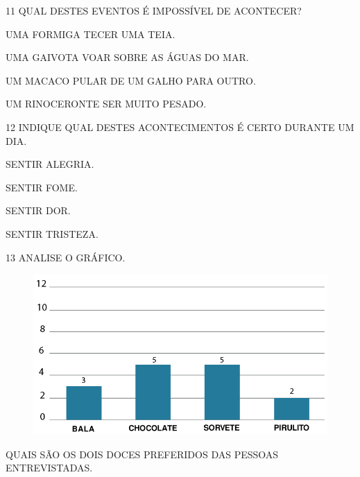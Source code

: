 \vspace{1cm}

\num{11} QUAL DESTES EVENTOS É IMPOSSÍVEL DE ACONTECER?

\begin{escolha}
\item UMA FORMIGA TECER UMA TEIA.

\item UMA GAIVOTA VOAR SOBRE AS ÁGUAS DO MAR.

\item UM MACACO PULAR DE UM GALHO PARA OUTRO.

\item UM RINOCERONTE SER MUITO PESADO.
\end{escolha}

\vspace{1cm}

\num{12} INDIQUE QUAL DESTES ACONTECIMENTOS É CERTO DURANTE UM DIA.

\begin{escolha}
\item SENTIR ALEGRIA.

\item SENTIR FOME.

\item SENTIR DOR.

\item SENTIR TRISTEZA.
\end{escolha}

\pagebreak
\num{13} ANALISE O GRÁFICO.

\begin{figure}[H]
\includegraphics[width=\textwidth]{./media/SAEB_1ANO_MAT_FIGURA118.png}
\end{figure}

QUAIS SÃO OS DOIS DOCES PREFERIDOS DAS PESSOAS ENTREVISTADAS.

